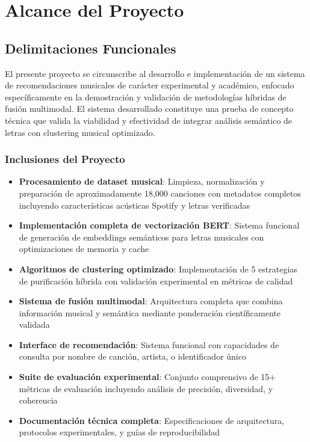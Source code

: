 \documentclass[12pt,a4paper]{article}
\begin{document}
\section{Alcance del Proyecto}

\subsection{Delimitaciones Funcionales}

El presente proyecto se circunscribe al desarrollo e implementación de un sistema de recomendaciones musicales de carácter experimental y académico, enfocado específicamente en la demostración y validación de metodologías híbridas de fusión multimodal. El sistema desarrollado constituye una prueba de concepto técnica que valida la viabilidad y efectividad de integrar análisis semántico de letras con clustering musical optimizado.

\subsubsection{Inclusiones del Proyecto}

\begin{itemize}
    \item \textbf{Procesamiento de dataset musical}: Limpieza, normalización y preparación de aproximadamente 18,000 canciones con metadatos completos incluyendo características acústicas Spotify y letras verificadas
    \item \textbf{Implementación completa de vectorización BERT}: Sistema funcional de generación de embeddings semánticos para letras musicales con optimizaciones de memoria y cache
    \item \textbf{Algoritmos de clustering optimizado}: Implementación de 5 estrategias de purificación híbrida con validación experimental en métricas de calidad
    \item \textbf{Sistema de fusión multimodal}: Arquitectura completa que combina información musical y semántica mediante ponderación científicamente validada
    \item \textbf{Interface de recomendación}: Sistema funcional con capacidades de consulta por nombre de canción, artista, o identificador único
    \item \textbf{Suite de evaluación experimental}: Conjunto comprensivo de 15+ métricas de evaluación incluyendo análisis de precisión, diversidad, y coherencia
    \item \textbf{Documentación técnica completa}: Especificaciones de arquitectura, protocolos experimentales, y guías de reproducibilidad
\end{itemize}
\end{document}
